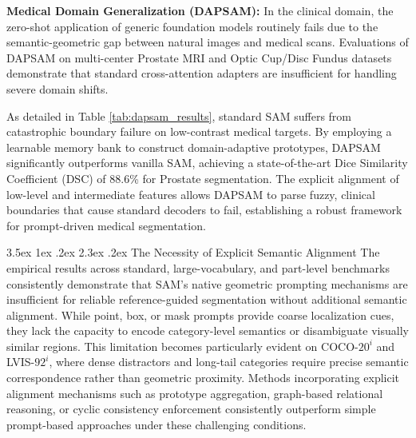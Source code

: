 \documentclass[journal,12pt,onecolumn,draftclsnofoot]{IEEEtran}
\makeatletter
\newcounter{chapter}
\renewcommand{\thechapter}{\arabic{chapter}}
\newcommand{\my@chapter}[1]{%
    \cleardoublepage 
    \par\vspace*{4ex}%
    \refstepcounter{chapter}%
    \setcounter{section}{0}%
    \setcounter{figure}{0}%
    \setcounter{table}{0}%
    \setcounter{equation}{0}%
    \addcontentsline{toc}{chapter}{\protect\numberline{\thechapter}#1}%
    \addtocontents{lof}{\protect\addvspace{10\p@}}%
    \addtocontents{lot}{\protect\addvspace{10\p@}}%
    {\noindent\normalfont\Huge\bfseries Chapter \thechapter \par\vspace{2ex}\noindent\huge #1\par}%
    \@afterheading
    \vspace*{4ex}%
}
\newcommand{\my@schapter}[1]{%
    \cleardoublepage
    \par\vspace*{4ex}%
    {\noindent\normalfont\Huge\bfseries #1\par}%
    \@afterheading
    \vspace*{4ex}%
}
\def\chapter{\@ifstar{\my@schapter}{\my@chapter}}
\renewcommand{\section}{\@startsection{section}{1}{\z@}%
    {3.5ex \@plus 1ex \@minus .2ex}%
    {2.3ex \@plus.2ex}%
    {\normalfont\Large\bfseries}}
\makeatother
\begin{document}
\noindent\textbf{Medical Domain Generalization (DAPSAM):}
In the clinical domain, the zero-shot application of generic foundation models routinely fails due to the semantic-geometric gap between natural images and medical scans. Evaluations of DAPSAM on multi-center Prostate MRI and Optic Cup/Disc Fundus datasets demonstrate that standard cross-attention adapters are insufficient for handling severe domain shifts. 

As detailed in Table \ref{tab:dapsam_results}, standard SAM suffers from catastrophic boundary failure on low-contrast medical targets. By employing a learnable memory bank to construct domain-adaptive prototypes, DAPSAM significantly outperforms vanilla SAM, achieving a state-of-the-art Dice Similarity Coefficient (DSC) of 88.6\% for Prostate segmentation. The explicit alignment of low-level and intermediate features allows DAPSAM to parse fuzzy, clinical boundaries that cause standard decoders to fail, establishing a robust framework for prompt-driven medical segmentation.

\begin{table}[htbp]
\centering
\caption{Domain Generalization Results on Medical Datasets (Dice Score \%)}
\label{tab:dapsam_results}
\end{table}


\chapter{Technical Discussion}

\section{The Necessity of Explicit Semantic Alignment}
The empirical results across standard, large-vocabulary, and part-level benchmarks consistently demonstrate that SAM's native geometric prompting mechanisms are insufficient for reliable reference-guided segmentation without additional semantic alignment. While point, box, or mask prompts provide coarse localization cues, they lack the capacity to encode category-level semantics or disambiguate visually similar regions. This limitation becomes particularly evident on COCO-$20^i$ and LVIS-$92^i$, where dense distractors and long-tail categories require precise semantic correspondence rather than geometric proximity. Methods incorporating explicit alignment mechanisms such as prototype aggregation, graph-based relational reasoning, or cyclic consistency enforcement consistently outperform simple prompt-based approaches under these challenging conditions.
\end{document}
